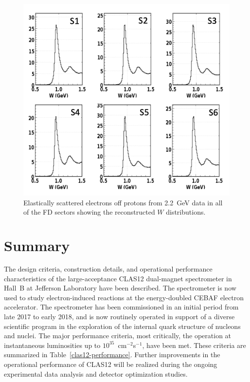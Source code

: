 \documentclass[final,3p,twocolumn]{elsarticle}
\begin{document}
\begin{figure}[t!]
\centerline{\includegraphics[width=0.9\columnwidth]{elastic-electrons.png}}
\caption{Elastically scattered electrons off protons from 2.2~GeV data in all of the FD sectors showing the
  reconstructed $W$ distributions.}
\label{elastic-electrons}
\end{figure}

\section{Summary} 

The design criteria, construction details, and operational performance characteristics of the large-acceptance
CLAS12 dual-magnet spectrometer in Hall~B at Jefferson Laboratory have been described. The spectrometer is
now used to study electron-induced reactions at the energy-doubled CEBAF electron accelerator. The spectrometer
has been commissioned in an initial period from late 2017 to early 2018, and is now routinely operated in support of
a diverse scientific program in the exploration of the internal quark structure of nucleons and nuclei. The major
performance criteria, most critically, the operation at  instantaneous luminosities up to $10^{35}$~cm$^{-2}$s$^{-1}$,
have been met. These criteria are summarized in Table~\ref{clas12-performance}. Further improvements in the
operational performance of CLAS12 will be realized during the ongoing experimental data analysis and detector
optimization studies.
\end{document}
